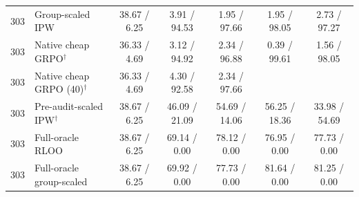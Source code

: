 \begin{tabular}{rlccccc}
303 & Group-scaled IPW & 38.67 / 6.25 & 3.91 / 94.53 & 1.95 / 97.66 & 1.95 / 98.05 & 2.73 / 97.27 \\
303 & Native cheap GRPO$^\dagger$ & 36.33 / 4.69 & 3.12 / 94.92 & 2.34 / 96.88 & 0.39 / 99.61 & 1.56 / 98.05 \\
303 & Native cheap GRPO (40)$^\dagger$ & 36.33 / 4.69 & 4.30 / 92.58 & 2.34 / 97.66 &  &  \\
303 & Pre-audit-scaled IPW$^\dagger$ & 38.67 / 6.25 & 46.09 / 21.09 & 54.69 / 14.06 & 56.25 / 18.36 & 33.98 / 54.69 \\
303 & Full-oracle RLOO & 38.67 / 6.25 & 69.14 / 0.00 & 78.12 / 0.00 & 76.95 / 0.00 & 77.73 / 0.00 \\
303 & Full-oracle group-scaled & 38.67 / 6.25 & 69.92 / 0.00 & 77.73 / 0.00 & 81.64 / 0.00 & 81.25 / 0.00 \\
\bottomrule
\end{tabular}
